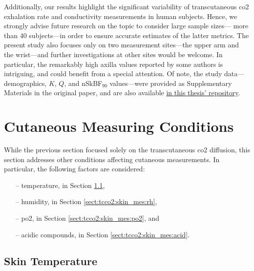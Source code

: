 Additionally, our results highlight the significant variability of transcutaneous \gls{co2} exhalation rate and conductivity measurements in human subjects. Hence, we strongly advise future research on the topic to consider large sample sizes---\ie{} more than 40 subjects---in order to ensure accurate estimates of the latter metrics. The present study also focuses only on two measurement sites---the upper arm and the wrist---and further investigations at other sites would be welcome. In particular, the remarkably high axilla values reported by some authors is intriguing, and could benefit from a special attention. Of note, the study data---demographics, $K$, $Q$, and nSkBF$_{90}$ values---were provided as Supplementary Materials in the original paper\cite{dervieux2023rate}, and are also available \href{https://github.com/e-dervieux/phd_thesis/blob/3e53e696ef4b105ec8dc7f57cd9c5f0bb30bf039/2_appendices/tcco2_sm.csv}{in this thesis' repository}.

\section{Cutaneous Measuring Conditions}\label{sect:tcco2:skin_conditions}

While the previous section focused solely on the transcutaneous \gls{co2} diffusion, this section addresses other conditions affecting cutaneous measurements. In particular, the following factors are considered:
\begin{multicols}{2}
	\begin{itemize}
		\item[--] temperature, in Section \ref{sect:tcco2:skin_mes:temp},
		\item[--] humidity, in Section \ref{sect:tcco2:skin_mes:rh},
		\item[--] \gls{po2}, in Section \ref{sect:tcco2:skin_mes:po2}, and
		\item[--] acidic compounds, in Section \ref{sect:tcco2:skin_mes:acid}.
	\end{itemize}
\end{multicols}

\subsection{Skin Temperature}\label{sect:tcco2:skin_mes:temp}

